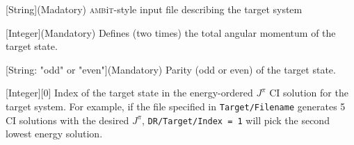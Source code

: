 \documentclass{report}
\newcommand{\ambit}{\textsc{amb}{\footnotesize i}\textsc{t}}
\begin{document}
[String]{(Madatory) \ambit-style input file describing the target system}

[Integer]{(Mandatory) Defines (two times) the total angular momentum of the target state.}

[String: "odd" or "even"]{(Mandatory) Parity (odd or even) of the target state.}

[Integer][0]{%
Index of the target state in the energy-ordered $J^{\pi}$ CI solution for the target system.
For example, if the file specified in \texttt{Target/Filename} generates 5 CI solutions with the desired
$J^{\pi}$, \texttt{DR/Target/Index = 1} will pick the second lowest energy solution.%
}
\end{document}
